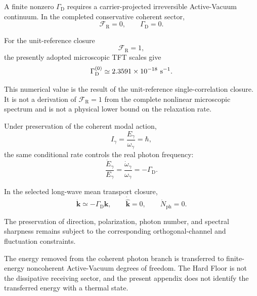 A finite nonzero $\Gamma_{\mathrm D}$ requires a carrier-projected
irreversible Active-Vacuum continuum. In the completed conservative coherent
sector,
\begin{equation}
    \mathcal F_{\mathrm R}=0,
    \qquad
    \Gamma_{\mathrm D}=0.
\end{equation}

For the unit-reference closure
\begin{equation}
    \mathcal F_{\mathrm R}=1,
\end{equation}
the presently adopted microscopic TFT scales give
\begin{equation}
    \Gamma_{\mathrm D}^{(0)}
    \simeq
    2.3591\times10^{-18}
    \ {\rm s^{-1}}.
\end{equation}

This numerical value is the result of the unit-reference
single-correlation closure. It is not a derivation of
$\mathcal F_{\mathrm R}=1$ from the complete nonlinear microscopic spectrum
and is not a physical lower bound on the relaxation rate.

Under preservation of the coherent modal action,
\begin{equation}
    I_{\gamma}
    =
    \frac{
        E_{\gamma}
    }{
        \omega_{\gamma}
    }
    =
    \hbar,
\end{equation}
the same conditional rate controls the real photon frequency:
\begin{equation}
    \frac{
        \dot E_{\gamma}
    }{
        E_{\gamma}
    }
    =
    \frac{
        \dot\omega_{\gamma}
    }{
        \omega_{\gamma}
    }
    =
    -\Gamma_{\mathrm D}.
\end{equation}

In the selected long-wave mean transport closure,
\begin{equation}
    \dot{\mathbf{k}}
    \simeq
    -\Gamma_{\mathrm D}\mathbf{k},
    \qquad
    \dot{\hat{\mathbf{k}}}=0,
    \qquad
    \dot N_{\mathrm{ph}}=0.
\end{equation}

The preservation of direction, polarization, photon number, and spectral
sharpness remains subject to the corresponding orthogonal-channel and
fluctuation constraints.

The energy removed from the coherent photon branch is transferred to
finite-energy noncoherent Active-Vacuum degrees of freedom. The Hard Floor is
not the dissipative receiving sector, and the present appendix does not
identify the transferred energy with a thermal state.

